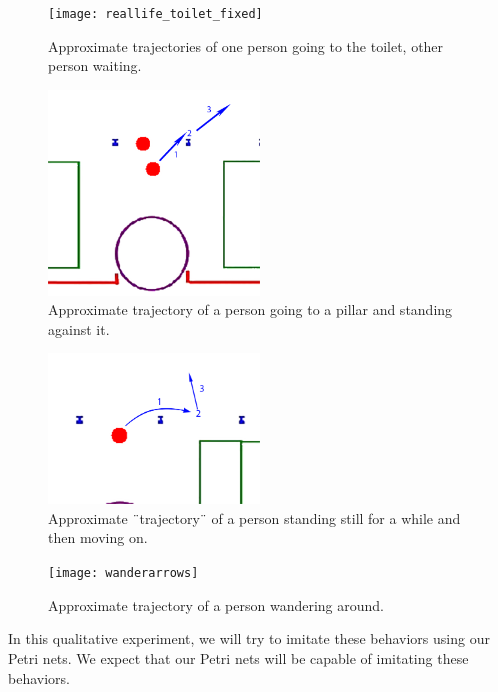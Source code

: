 \documentclass[11pt, a4paper]{book}
\begin{document}
\begin{figure}
\centering
\texttt{[image: reallife\_toilet\_fixed]}
\caption{Approximate trajectories of one person going to the toilet, other person waiting.}
\label{fig:reallifetoilettrajectory}
\end{figure}
\begin{figure}
\centering
\includegraphics[width=0.5\textwidth]{"./qualitative experiment pictures/zoomed_in_leanagainstpillar_reallife"}
\caption{Approximate trajectory of a person going to a pillar and standing against it.}
\label{fig:reallifepillartrajectory}
\end{figure}
\begin{figure}
\centering
\includegraphics[width=0.5\textwidth]{"./qualitative experiment pictures/zoomed_in_standstill_reallife"}
\caption{Approximate ¨trajectory¨ of a person standing still for a while and then moving on.}
\label{fig:reallifestandstilltrajectory}
\end{figure}
\begin{figure}
\centering
\texttt{[image: wanderarrows]}
\caption{Approximate trajectory of a person wandering around.}
\label{fig:reallifewandertrajectory}
\end{figure}
In this qualitative experiment, we will try to imitate these behaviors using our Petri nets. We expect that our Petri nets will be capable of imitating these behaviors.


\end{document}
